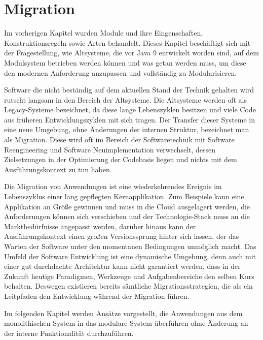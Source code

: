 
\newpage \chapter{Migration}
	Im vorherigen Kapitel wurden Module und ihre Eingenschaften, Konstruktionsregeln sowie Arten behandelt. 
	Dieses Kapitel beschäftigt sich mit der Fragestellung, wie Altsysteme, die vor Java 9 entwickelt worden sind, auf dem Modulsystem betrieben werden können und was getan werden muss, um diese den modernen Anforderung anzupassen und vollständig zu Modularisieren.\bigbreak

	Software die nicht beständig auf dem aktuellen Stand der Technik gehalten wird rutscht langsam in den Bereich der Altsysteme. Die Altsysteme werden oft als Legacy-Systeme bezeichnet, da diese lange Lebenszyklen besitzen und viele Code aus früheren Entwicklungszyklen mit sich tragen. Der Transfer dieser Systeme in eine neue Umgebung, ohne Änderungen der internen Struktur, bezeichnet man als Migration. Diese wird oft im Bereich der Softwaretechnik mit Software Reengineering und Software Neuimplementation verwechselt, dessen Zielsetzungen in der Optimierung der Codebasis liegen und nichts mit dem Ausführungskontext zu tun haben. \bigbreak

	Die Migration von Anwendungen ist eine wiederkehrendes Ereignis im Lebenszyklus einer lang gepflegten Kernapplikation.
	Zum Beispiele kann eine Applikation an Größe gewinnen und muss in die Cloud ausgelagert werden, die Anforderungen können sich verschieben und der Technologie-Stack muss an die Marktbedürfnisse angepasst werden, darüber hinaus kann der Ausführungskontext einen großen Versionssprung hinter sich lassen, der das Warten der Software unter den momentanen Bedingungen unmöglich macht. Das Umfeld der Software Entwicklung ist eine dynamische Umgebung, denn auch mit einer gut durchdachte Architektur kann nicht garantiert werden, dass in der Zukunft heutige Paradigmen, Werkzeuge und Aufgabenbereiche den selben Kurs behalten. Deswegen existieren bereits sämtliche Migrationsstrategien, die als ein Leitpfaden den Entwicklung während der Migration führen. \bigbreak

	Im folgenden Kapitel werden Ansätze vorgestellt, die Anwendungen aus dem monolithischen System in das modulare System überführen ohne Änderung an der interne Funktionalität durchzuführen. 


